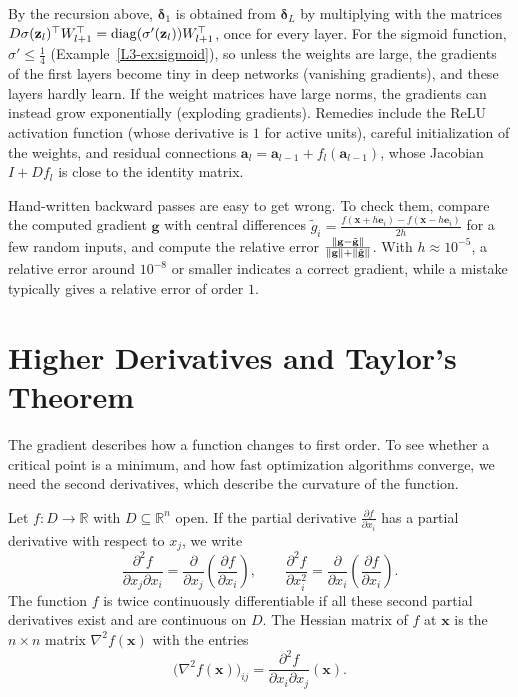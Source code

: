 \begin{remark}
    By the recursion above, $\boldsymbol{\delta}_1$ is obtained from $\boldsymbol{\delta}_L$ by multiplying with the matrices $D\sigma(\mathbf{z}_l)^\top W_{l+1}^\top = \operatorname{diag}(\sigma'(\mathbf{z}_l)) W_{l+1}^\top$, once for every layer. For the sigmoid function, $\sigma' \leq \frac{1}{4}$ (Example~\ref{L3-ex:sigmoid}), so unless the weights are large, the gradients of the first layers become tiny in deep networks (vanishing gradients), and these layers hardly learn. If the weight matrices have large norms, the gradients can instead grow exponentially (exploding gradients). Remedies include the ReLU activation function (whose derivative is $1$ for active units), careful initialization of the weights, and residual connections $\mathbf{a}_l = \mathbf{a}_{l-1} + f_l(\mathbf{a}_{l-1})$, whose Jacobian $I + Df_l$ is close to the identity matrix.
\end{remark}

\begin{remark}
    Hand-written backward passes are easy to get wrong. To check them, compare the computed gradient $\mathbf{g}$ with central differences $\tilde{g}_i = \frac{f(\mathbf{x} + h\mathbf{e}_i) - f(\mathbf{x} - h\mathbf{e}_i)}{2h}$ for a few random inputs, and compute the relative error $\frac{\lVert \mathbf{g} - \tilde{\mathbf{g}} \rVert}{\lVert \mathbf{g} \rVert + \lVert \tilde{\mathbf{g}} \rVert}$. With $h \approx 10^{-5}$, a relative error around $10^{-8}$ or smaller indicates a correct gradient, while a mistake typically gives a relative error of order $1$.
\end{remark}

\section{Higher Derivatives and Taylor's Theorem}\label{L3-sec:hessian}

The gradient describes how a function changes to first order. To see whether a critical point is a minimum, and how fast optimization algorithms converge, we need the second derivatives, which describe the curvature of the function.

\begin{definition}\label{L3-def:hessian}
    Let $f: D \to \mathbb{R}$ with $D \subseteq \mathbb{R}^n$ open. If the partial derivative $\frac{\partial f}{\partial x_i}$ has a partial derivative with respect to $x_j$, we write
    \[\frac{\partial^2 f}{\partial x_j \partial x_i} = \frac{\partial}{\partial x_j}\left(\frac{\partial f}{\partial x_i}\right), \qquad \frac{\partial^2 f}{\partial x_i^2} = \frac{\partial}{\partial x_i}\left(\frac{\partial f}{\partial x_i}\right).\]
    The function $f$ is twice continuously differentiable if all these second partial derivatives exist and are continuous on $D$. The Hessian matrix of $f$ at $\mathbf{x}$ is the $n \times n$ matrix $\nabla^2 f(\mathbf{x})$ with the entries
    \[\big(\nabla^2 f(\mathbf{x})\big)_{ij} = \frac{\partial^2 f}{\partial x_i \partial x_j}(\mathbf{x}).\]
\end{definition}


